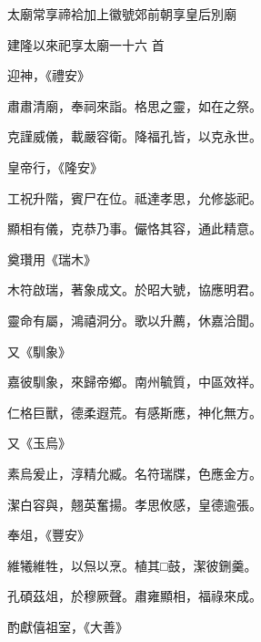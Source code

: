 
\begin{pinyinscope}

 太廟常享禘袷加上徽號郊前朝享皇后別廟



 建隆以來祀享太廟一十六
 首



 迎神，《禮安》



 肅肅清廟，奉祠來詣。格思之靈，如在之祭。



 克謹威儀，載嚴容衛。降福孔皆，以克永世。



 皇帝行，《隆安》



 工祝升階，賓尸在位。祗達孝思，允修毖祀。



 顯相有儀，克恭乃事。儼恪其容，通此精意。



 奠瓚用《瑞木》



 木符啟瑞，著象成文。於昭大號，協應明君。



 靈命有屬，鴻禧洞分。歌以升薦，休嘉洽聞。



 又《馴象》



 嘉彼馴象，來歸帝鄉。南州毓質，中區效祥。



 仁格巨獸，德柔遐荒。有感斯應，神化無方。



 又《玉烏》



 素烏爰止，淳精允臧。名符瑞牒，色應金方。



 潔白容與，翹英奮揚。孝思攸感，皇德逾張。



 奉俎，《豐安》



 維犧維牲，以炰以烹。植其□鼓，潔彼鉶羹。



 孔碩茲俎，於穆厥聲。肅雍顯相，福祿來成。



 酌獻僖祖室，《大善》




\end{pinyinscope}

